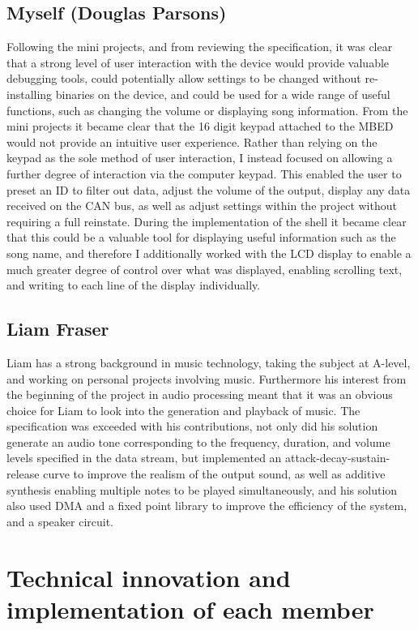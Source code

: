 \subsection*{Myself (Douglas Parsons)}
Following the mini projects, and from reviewing the specification, it was clear 
that a strong level of user interaction with the device would provide valuable 
debugging tools, could potentially allow settings to be changed without 
re-installing binaries on the device, and could be used for a wide range of 
useful functions, such as changing the volume or displaying song information. 
From the mini projects it became clear that the 16 digit keypad attached to the 
MBED would not provide an intuitive user experience. Rather than relying on 
the keypad as the sole method of user interaction, I instead focused 
on allowing a further degree of interaction via the computer keypad. This 
enabled the user to preset an ID to filter out data, adjust the volume of the 
output, display any data received on the CAN bus, as 
well as adjust settings within the project without requiring a full reinstate.
During the implementation of the shell it became clear that this could be a 
valuable tool for displaying useful information such as the song name, and 
therefore I additionally worked with the LCD display to enable a much greater 
degree of control over what was displayed, enabling scrolling text, and writing 
to each line of the display individually.

\subsection*{Liam Fraser}
Liam has a strong background in music technology, taking the subject at A-level,
and working on personal projects involving music. Furthermore his interest from 
the beginning of the project in audio processing meant that it was an obvious 
choice for Liam to look into the generation and playback of music. The 
specification was exceeded with his contributions, not only did his solution 
generate an audio tone corresponding to the frequency, duration, and volume 
levels specified in the data stream, but implemented an attack-decay-sustain-release 
curve to improve the realism of the output sound, as well as additive synthesis 
enabling multiple notes to be played simultaneously, and his solution also 
used DMA and a fixed point library to improve the efficiency of the system, and 
a speaker circuit.

\section{Technical innovation and implementation of each member}
